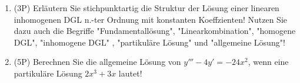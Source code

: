\begin{enumerate}[label=(\alph*)]
	
	\item (3P) Erläutern Sie stichpunktartig die Struktur der Lösung einer linearen inhomogenen DGL n.-ter Ordnung mit konstanten Koeffzienten! Nutzen Sie dazu auch die Begriffe "Fundamentallösung", "Linearkombination", "homogene DGL", "inhomogene DGL" , "partikuläre Lösung" und "allgemeine Lösung"!
	
	\bigskip
	\bigskip
	\bigskip
	\bigskip
	\bigskip
	\bigskip
	\bigskip
	\bigskip
	\bigskip
	\bigskip
	\bigskip
	\bigskip
	\bigskip
	\bigskip
	\bigskip
	\bigskip
	\bigskip
	\bigskip
	
	\item (5P) Berechnen Sie die allgemeine Lösung von $y'''-4y'=-24x^2$, wenn eine partikuläre Lösung $2x^3+3x$ lautet!
	
\end{enumerate}
